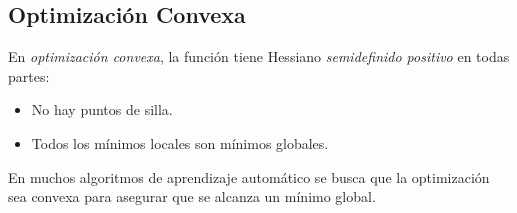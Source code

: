 \subsection{Optimización Convexa}

En \emph{optimización convexa}, la función tiene Hessiano \emph{semidefinido positivo} en todas partes:

\begin{itemize}
  \item No hay puntos de silla.
  \item Todos los mínimos locales son mínimos globales.
\end{itemize}

En muchos algoritmos de aprendizaje automático se busca que la optimización sea convexa para asegurar que se alcanza un mínimo global. 


\endinput
